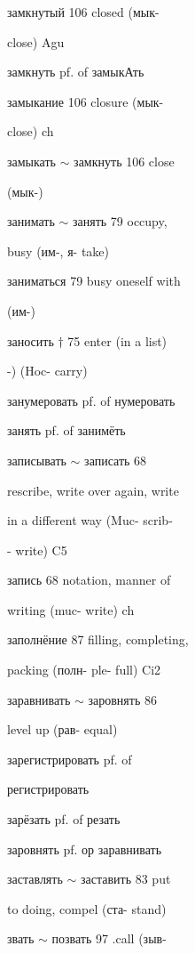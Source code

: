 \begin{minipage}[t]{0.475\textwidth}
\raggedright
\noindent замкнутый 106 closed (мык-\par
\noindent close) Agu\par
\noindent замкнуть pf. of замыкАть\par
\noindent замыкание 106 closure (мык-\par
\noindent close) ch\par
\noindent замыкать $\sim$ замкнуть 106 close\par
\noindent (мык-)\par
{} занимать $\sim$ занять 79 occupy,\par
\noindent busy (им-, я- take)\par
\noindent заниматься 79 busy oneself with\par
\noindent (им-)\par
\noindent заносить $\dagger$ 75 enter (in a list)\par
\noindent -) (Hoc- carry)\par
\noindent занумеровать pf. of нумеровать\par
\noindent занять pf. of занимёть\par
\noindent записывать $\sim$ записать 68\par
{} rescribe, write over again, write\par
\noindent in a different way (Muc- scrib-\par
\noindent - write) C5\par
\noindent запись 68 notation, manner of\par
\noindent writing (muc- write) ch\par
\noindent заполнёние 87 filling, completing,\par
\noindent packing (полн- ple- full) Ci2\par
\noindent заравнивать $\sim$ заровнять 86\par
\noindent level up (рав- equal)\par
\noindent зарегистрировать pf. of\par
\noindent регистрировать\par
\noindent зарёзать pf. of резать\par
\noindent заровнять pf. ор заравнивать\par
\noindent заставлять $\sim$ заставить 83 put\par
\noindent to doing, compel (ста- stand)\par
\noindent звать $\sim$ позвать 97 .call (зыв-\par

\end{minipage}
